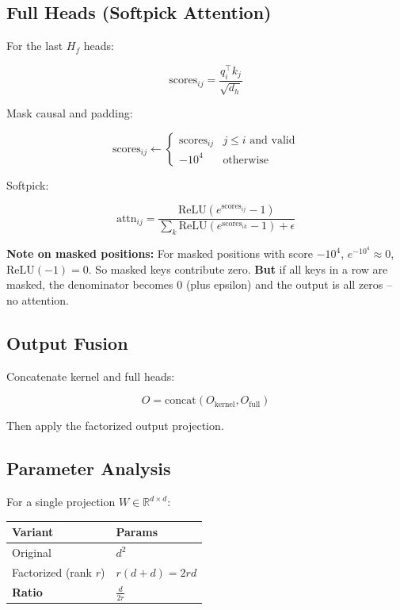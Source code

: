\subsection{Full Heads (Softpick Attention)}

For the last $H_f$ heads:

\[
\text{scores}_{ij} = \frac{q_i^\top k_j}{\sqrt{d_h}}
\tag{4.7}
\]

Mask causal and padding:

\[
\text{scores}_{ij} \leftarrow \begin{cases} \text{scores}_{ij} & j \leq i \text{ and valid} \\ -10^4 & \text{otherwise} \end{cases}
\tag{4.8}
\]

Softpick:

\[
\text{attn}_{ij} = \frac{\text{ReLU}(e^{\text{scores}_{ij}} - 1)}{\sum_k \text{ReLU}(e^{\text{scores}_{ik}} - 1) + \epsilon}
\tag{4.9}
\]

\textbf{Note on masked positions:} For masked positions with score $-10^4$, 
$e^{-10^4} \approx 0$, $\text{ReLU}(-1) = 0$. So masked keys contribute 
zero. \textbf{But} if all keys in a row are masked, the denominator becomes 0 
(plus epsilon) and the output is all zeros -- no attention.

\subsection{Output Fusion}

Concatenate kernel and full heads:

\[
O = \text{concat}(O_{\text{kernel}}, O_{\text{full}})
\tag{4.10}
\]

Then apply the factorized output projection.

\subsection{Parameter Analysis}

For a single projection $W \in \mathbb{R}^{d \times d}$:

\begin{table}[H]
\centering
\small
\begin{tabular}{ll}
\toprule
\textbf{Variant} & \textbf{Params} \\
\midrule
Original & $d^2$ \\
Factorized (rank $r$) & $r(d + d) = 2rd$ \\
\textbf{Ratio} & $\frac{d}{2r}$ \\
\bottomrule
\end{tabular}
\end{table}

